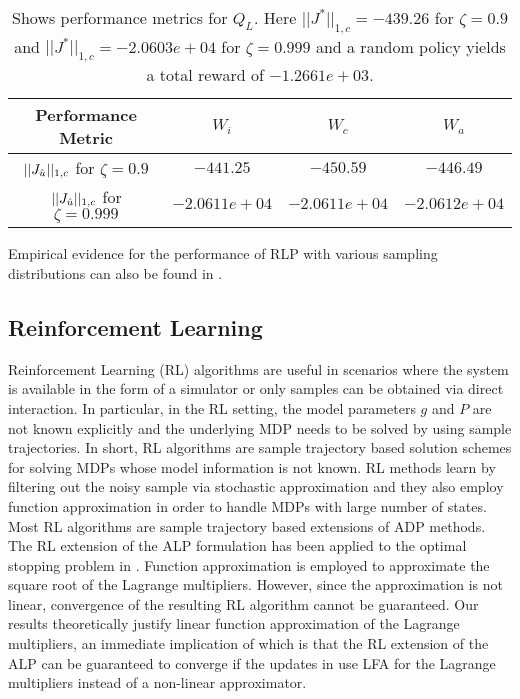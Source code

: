 \FloatBarrier
\begin{table}[H]
\begin{center}
\begin{tabular}{|c|c|c|c|}\hline
Performance Metric&	$W_i$&	$W_c$& $W_a$ \\\hline
$||J_{\hat{u}}||_{1,c}$ for $\zeta=0.9$& $-441.25$&	$-450.59$& $-446.49$ \\\hline
$||J_{\hat{u}}||_{1,c}$ for $\zeta=0.999$& $-2.0611e+04$&	$-2.0611e+04$& $-2.0612e+04$ \\\hline
\end{tabular}
\end{center}
\caption{Shows performance metrics for $Q_L$. Here $||J^*||_{1,c}=-439.26$ for $\zeta=0.9$ and $||J^*||_{1,c}=-2.0603e+04$ for $\zeta=0.999$   and a random policy yields a total reward of $-1.2661e+03
$.}
\label{pref}
\end{table}
Empirical evidence for the performance of RLP with various sampling distributions can also be found in \cite{CST,CS}.
\subsection{Reinforcement Learning}
Reinforcement Learning (RL) algorithms are useful in scenarios where the system is available in the form of a simulator or only samples can be obtained via direct interaction. In particular, in the RL setting, the model parameters $g$ and $P$ are not known explicitly and the underlying MDP needs to be solved by using sample trajectories. In short, RL algorithms are sample trajectory based solution schemes for solving MDPs whose model information is not known. RL methods learn by filtering out the noisy sample via stochastic approximation and they also employ function approximation in order to handle MDPs with large number of states. Most RL algorithms are sample trajectory based extensions of ADP methods.\\
The RL extension of the ALP formulation has been applied to the optimal stopping problem in \cite{ALP-Bor}. Function approximation is employed to approximate the square root of the Lagrange multipliers. However, since the approximation is not linear, convergence of the resulting RL algorithm cannot be guaranteed. Our results theoretically justify linear function approximation of the Lagrange multipliers, an immediate implication of which is that the RL extension of the ALP can be guaranteed to converge if the updates in \cite{ALP-Bor} use LFA for the Lagrange multipliers instead of a non-linear approximator.
